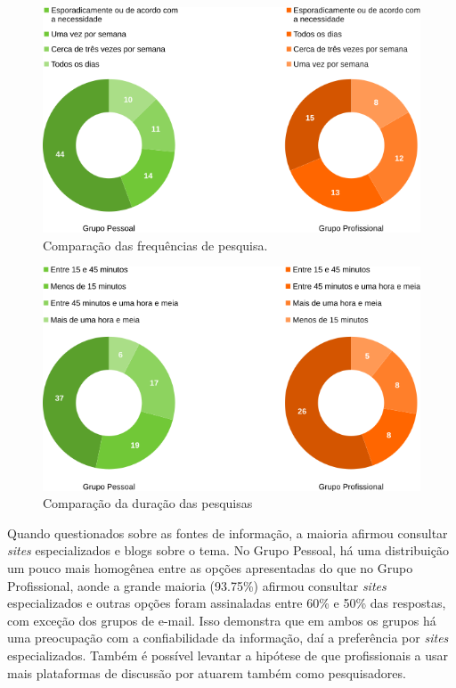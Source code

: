\begin{figure}[!htbp]
\centering
\caption{\label{graf-freq}Comparação das frequências de pesquisa.}
\includegraphics[width=\textwidth]{images/freq.png}
\end{figure}

\begin{figure}[!htbp]
\centering
\caption{\label{graf-tempo}Comparação da duração das pesquisas}
\includegraphics[width=\textwidth]{images/tempo.png}
\end{figure}


Quando questionados sobre as fontes de informação, a maioria afirmou consultar \emph{sites} especializados e blogs sobre o tema. No Grupo Pessoal, há uma distribuição um pouco mais homogênea entre as opções apresentadas do que no Grupo Profissional, aonde a grande maioria (93.75\%) afirmou consultar \emph{sites} especializados e outras opções foram assinaladas entre 60\% e 50\% das respostas, com exceção dos grupos de e-mail. Isso demonstra que em ambos os grupos há uma preocupação com a confiabilidade da informação, daí a preferência por \emph{sites} especializados. Também é possível levantar a hipótese de que profissionais a usar mais plataformas de discussão por atuarem também como pesquisadores.

